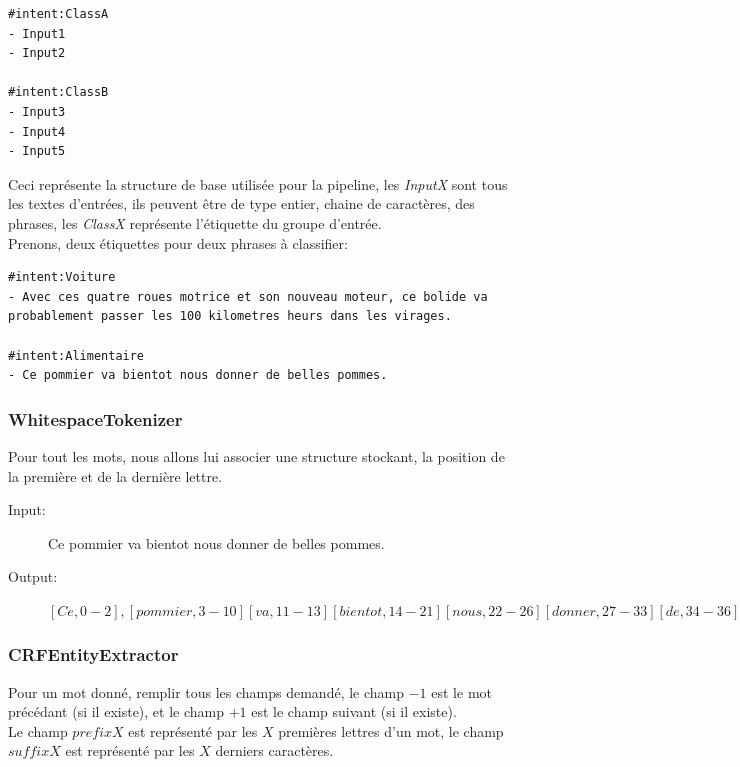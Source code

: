 \begin{lstlisting}
#intent:ClassA
- Input1
- Input2

#intent:ClassB
- Input3
- Input4
- Input5
\end{lstlisting}

Ceci représente la structure de base utilisée pour la pipeline, les \textit{InputX} sont tous les textes d'entrées, ils peuvent être de type entier, chaine de caractères, des phrases, les \textit{ClassX} représente l'étiquette du groupe d'entrée.\\
Prenons, deux étiquettes pour deux phrases à classifier:\\

\begin{lstlisting}
#intent:Voiture
- Avec ces quatre roues motrice et son nouveau moteur, ce bolide va probablement passer les 100 kilometres heurs dans les virages.

#intent:Alimentaire
- Ce pommier va bientot nous donner de belles pommes.
\end{lstlisting}

\subsubsection{WhitespaceTokenizer}
Pour tout les mots, nous allons lui associer une structure stockant, la position de la première et de la dernière lettre. 

\begin{description}
\item[Input:] Ce pommier va bientot nous donner de belles pommes.\\
\item[Output:] $[Ce,0-2],[pommier,3-10][va,11-13][bientot,14-21][nous,22-26][donner,27-33][de,34-36][belles,37-43][pommes,44-50]$
\end{description}

\pagebreak
\subsubsection{CRFEntityExtractor}
Pour un mot donné, remplir tous les champs demandé, le champ $-1$ est le mot précédant (si il existe), et le champ $+1$ est le champ suivant (si il existe).\\
Le champ $prefixX$ est représenté par les $X$ premières lettres d'un mot, le champ $suffixX$ est représenté par les $X$ derniers caractères.

